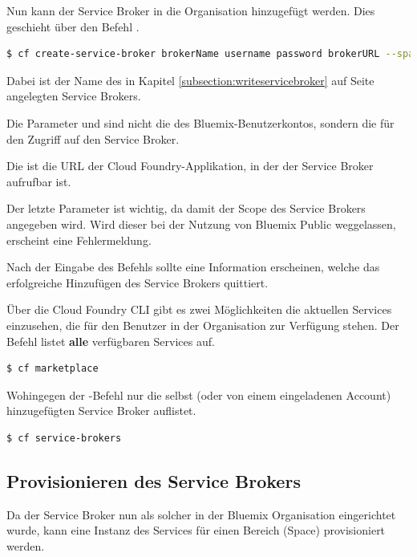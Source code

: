 Nun kann der Service Broker in die Organisation hinzugefügt werden. Dies geschieht über den Befehl .

\begin{lstlisting}[language=bash, caption=Service Broker einrichten, label=Service Broker einrichten]
   $ cf create-service-broker brokerName username password brokerURL --space-scoped
\end{lstlisting}

Dabei ist  der Name des in Kapitel \ref{subsection:writeservicebroker} auf Seite
\pageref{subsection:writeservicebroker} angelegten Service Brokers.

Die Parameter  und  sind nicht die des Bluemix-Benutzerkontos, sondern die für den Zugriff
auf den Service Broker.

Die  ist die URL der Cloud Foundry-Applikation, in der der Service Broker aufrufbar ist.

Der letzte Parameter  ist wichtig, da damit der Scope des Service Brokers angegeben wird. Wird dieser
bei der Nutzung von Bluemix Public weggelassen, erscheint eine Fehlermeldung.

Nach der Eingabe des Befehls sollte eine Information erscheinen, welche das erfolgreiche Hinzufügen des Service Brokers
quittiert.

Über die Cloud Foundry CLI gibt es zwei Möglichkeiten die aktuellen Services einzusehen, die für den Benutzer in der
Organisation zur Verfügung stehen. Der Befehl  listet \textbf{alle} verfügbaren Services auf.

\begin{lstlisting}[language=bash, caption=Auflisten aller verfügbaren Services, label=Auflisten aller verfügbaren Services]
   $ cf marketplace
\end{lstlisting}

Wohingegen der -Befehl nur die selbst (oder von einem eingeladenen Account) hinzugefügten Service
Broker auflistet.

\begin{lstlisting}[language=bash, caption=Auflisten aller Service Broker, label=Auflisten aller Service Broker]
   $ cf service-brokers
\end{lstlisting}

\subsection{Provisionieren des Service Brokers}
Da der Service Broker nun als solcher in der Bluemix Organisation eingerichtet wurde, kann eine Instanz des Services
für einen Bereich (Space) provisioniert werden.

